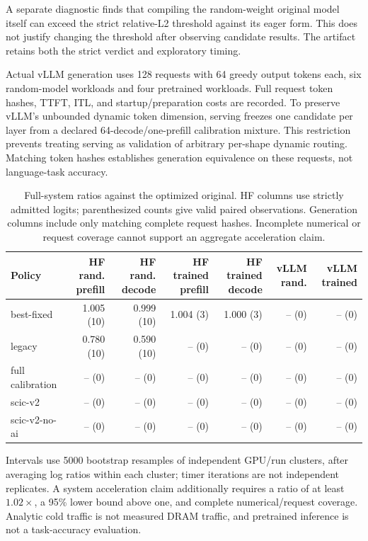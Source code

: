A separate diagnostic finds that compiling the random-weight original model itself can exceed the strict relative-L2 threshold against its eager form. This does not justify changing the threshold after observing candidate results. The artifact retains both the strict verdict and exploratory timing.

Actual vLLM generation uses 128 requests with 64 greedy output tokens each, six random-model workloads and four pretrained workloads. Full request token hashes, TTFT, ITL, and startup/preparation costs are recorded. To preserve vLLM's unbounded dynamic token dimension, serving freezes one candidate per layer from a declared 64-decode/one-prefill calibration mixture. This restriction prevents treating serving as validation of arbitrary per-shape dynamic routing. Matching token hashes establishes generation equivalence on these requests, not language-task accuracy.

\begin{table}[t]
\centering\small
\caption{Full-system ratios against the optimized original. HF columns use strictly admitted logits; parenthesized counts give valid paired observations. Generation columns include only matching complete request hashes. Incomplete numerical or request coverage cannot support an aggregate acceleration claim.}
\label{tab:v2-systems}
\begin{tabular}{lrrrrrr}
\toprule
Policy & HF rand. prefill & HF rand. decode & HF trained prefill & HF trained decode & vLLM rand. & vLLM trained \\
\midrule
best-fixed & 1.005 (10) & 0.999 (10) & 1.004 (3) & 1.000 (3) & -- (0) & -- (0) \\
legacy & 0.780 (10) & 0.590 (10) & -- (0) & -- (0) & -- (0) & -- (0) \\
full calibration & -- (0) & -- (0) & -- (0) & -- (0) & -- (0) & -- (0) \\
scic-v2 & -- (0) & -- (0) & -- (0) & -- (0) & -- (0) & -- (0) \\
scic-v2-no-ai & -- (0) & -- (0) & -- (0) & -- (0) & -- (0) & -- (0) \\
\bottomrule
\end{tabular}
\end{table}

Intervals use 5000 bootstrap resamples of independent GPU/run clusters, after averaging log ratios within each cluster; timer iterations are not independent replicates. A system acceleration claim additionally requires a ratio of at least $1.02\times$, a 95\% lower bound above one, and complete numerical/request coverage. Analytic cold traffic is not measured DRAM traffic, and pretrained inference is not a task-accuracy evaluation.

